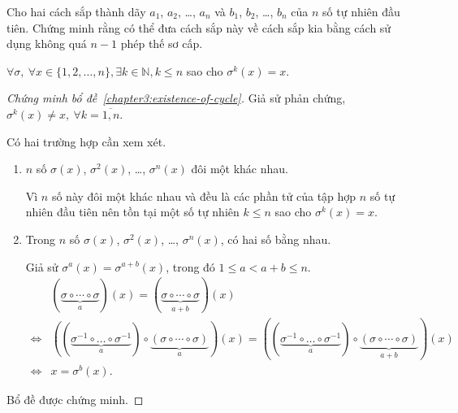 \documentclass[class=nhvh-linear-algebra,crop=false]{standalone}
\begin{document}
\begin{exercise}
	Cho hai cách sắp thành dãy $a_{1}$, $a_{2}$, \ldots, $a_{n}$ và $b_{1}$, $b_{2}$, \ldots, $b_{n}$ của $n$ số tự nhiên đầu tiên. Chứng minh rằng có thể đưa cách sắp này về cách sắp kia bằng cách sử dụng không quá $n-1$ phép thế sơ cấp.
\end{exercise}

\begin{lemma}\label{chapter3:fixed-point}
	$\forall\sigma,\ \forall x\in\{ 1,2,\ldots,n \}, \exists k\in\mathbb{N}, k\le n$ sao cho $\sigma^{k}(x) = x$.
\end{lemma}

\begin{proof}[Chứng minh bổ đề~\ref{chapter3:existence-of-cycle}]
	\par Giả sử phản chứng, $\sigma^{k}(x)\ne x,\ \forall k=\overline{1,n}$.
	\par Có hai trường hợp cần xem xét.
	\begin{enumerate}[label = Trường hợp \arabic*:,itemindent=2cm]
		\item $n$ số $\sigma(x)$, $\sigma^{2}(x)$, \ldots, $\sigma^{n}(x)$ đôi một khác nhau.
		      \par Vì $n$ số này đôi một khác nhau và đều là các phần tử của tập hợp $n$ số tự nhiên đầu tiên nên tồn tại một số tự nhiên $k\le n$ sao cho $\sigma^{k}(x) = x$.
		\item Trong $n$ số $\sigma(x)$, $\sigma^{2}(x)$, \ldots, $\sigma^{n}(x)$, có hai số bằng nhau.
		      \par Giả sử $\sigma^{a}(x) = \sigma^{a+b}(x)$, trong đó $1\le a < a + b\le n$.
		      \[
			      \begin{split}
				                      & (\underbrace{\sigma\circ\cdots\circ\sigma}_{a})(x) = (\underbrace{\sigma\circ\cdots\circ\sigma}_{a+b})(x)                                                                                                                                 \\
				      \Leftrightarrow & ((\underbrace{\sigma^{-1}\circ\ldots\circ\sigma^{-1}}_{a})\circ\underbrace{(\sigma\circ\cdots\circ\sigma)}_{a})(x) = ((\underbrace{\sigma^{-1}\circ\ldots\circ\sigma^{-1}}_{a})\circ\underbrace{(\sigma\circ\cdots\circ\sigma)}_{a+b})(x) \\
				      \Leftrightarrow & x = \sigma^{b}(x).
			      \end{split}
		      \]
	\end{enumerate}
	\par Bổ đề được chứng minh.
\end{proof}
\end{document}
